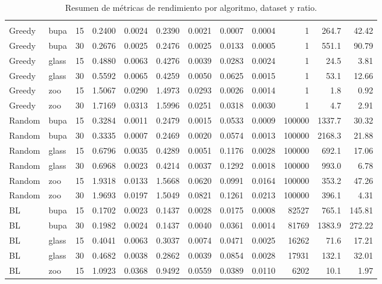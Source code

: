 \begin{longtable}{llcrrrrrrrrr}
    \bottomrule
    \noalign{\vspace{10pt}}
    \caption{Resumen de métricas de rendimiento por algoritmo, dataset y ratio.} \label{tab:metricas_resultados} \\
    \endlastfoot
    Greedy & bupa & 15 & 0.2400 & 0.0024 & 0.2390 & 0.0021 & 0.0007 & 0.0004 & 1 & 264.7 & 42.42 \\
    Greedy & bupa & 30 & 0.2676 & 0.0025 & 0.2476 & 0.0025 & 0.0133 & 0.0005 & 1 & 551.1 & 90.79 \\
    Greedy & glass & 15 & 0.4880 & 0.0063 & 0.4276 & 0.0039 & 0.0283 & 0.0024 & 1 & 24.5 & 3.81 \\
    Greedy & glass & 30 & 0.5592 & 0.0065 & 0.4259 & 0.0050 & 0.0625 & 0.0015 & 1 & 53.1 & 12.66 \\
    Greedy & zoo & 15 & 1.5067 & 0.0290 & 1.4973 & 0.0293 & 0.0026 & 0.0014 & 1 & 1.8 & 0.92 \\
    Greedy & zoo & 30 & 1.7169 & 0.0313 & 1.5996 & 0.0251 & 0.0318 & 0.0030 & 1 & 4.7 & 2.91 \\
    \midrule
    Random & bupa & 15 & 0.3284 & 0.0011 & 0.2479 & 0.0015 & 0.0533 & 0.0009 & 100000 & 1337.7 & 30.32 \\
    Random & bupa & 30 & 0.3335 & 0.0007 & 0.2469 & 0.0020 & 0.0574 & 0.0013 & 100000 & 2168.3 & 21.88 \\
    Random & glass & 15 & 0.6796 & 0.0035 & 0.4289 & 0.0051 & 0.1176 & 0.0028 & 100000 & 692.1 & 17.06 \\
    Random & glass & 30 & 0.6968 & 0.0023 & 0.4214 & 0.0037 & 0.1292 & 0.0018 & 100000 & 993.0 & 6.78 \\
    Random & zoo & 15 & 1.9318 & 0.0133 & 1.5668 & 0.0620 & 0.0991 & 0.0164 & 100000 & 353.2 & 47.26 \\
    Random & zoo & 30 & 1.9693 & 0.0197 & 1.5049 & 0.0821 & 0.1261 & 0.0213 & 100000 & 396.1 & 4.31 \\
    \midrule
    BL & bupa & 15 & 0.1702 & 0.0023 & 0.1437 & 0.0028 & 0.0175 & 0.0008 & 82527 & 765.1 & 145.81 \\
    BL & bupa & 30 & 0.1982 & 0.0024 & 0.1437 & 0.0040 & 0.0361 & 0.0014 & 81769 & 1383.9 & 272.22 \\
    BL & glass & 15 & 0.4041 & 0.0063 & 0.3037 & 0.0074 & 0.0471 & 0.0025 & 16262 & 71.6 & 17.21 \\
    BL & glass & 30 & 0.4682 & 0.0038 & 0.2862 & 0.0039 & 0.0854 & 0.0028 & 17931 & 132.1 & 32.01 \\
    BL & zoo & 15 & 1.0923 & 0.0368 & 0.9492 & 0.0559 & 0.0389 & 0.0110 & 6202 & 10.1 & 1.97 \\

\end{longtable}
